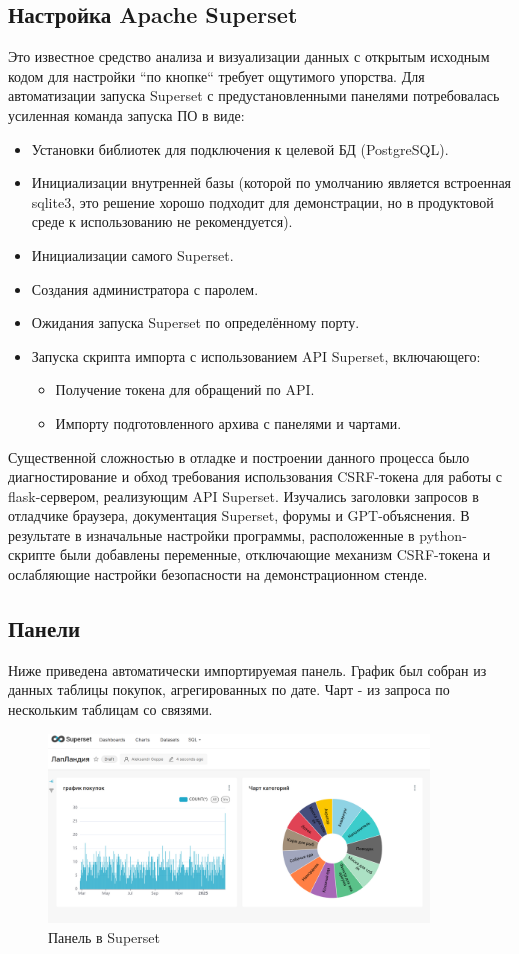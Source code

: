 \subsection{Настройка Apache Superset}\label{subsec:-apache-superset}
Это известное средство анализа и визуализации данных с открытым исходным кодом для настройки ``по кнопке``
требует ощутимого упорства.
Для автоматизации запуска Superset с предустановленными панелями потребовалась усиленная команда запуска ПО в виде:
\begin{itemize}
    \item Установки библиотек для подключения к целевой БД (PostgreSQL).
    \item Инициализации внутренней базы (которой по умолчанию является
    встроенная sqlite3, это решение хорошо подходит для демонстрации, но в продуктовой среде к использованию не
    рекомендуется).
    \item Инициализации самого Superset.
    \item Создания администратора с паролем.
    \item Ожидания запуска Superset по определённому порту.
    \item Запуска скрипта импорта с использованием API Superset, включающего:
    \begin{itemize}
              \item Получение токена для обращений по API\@.
              \item Импорту подготовленного архива с панелями и чартами.
    \end{itemize}
\end{itemize}

Существенной сложностью в отладке и построении данного процесса было диагностирование и обход требования
использования CSRF-токена для работы с flask-сервером, реализующим API Superset.
Изучались заголовки запросов в отладчике браузера, документация Superset, форумы и GPT-объяснения.
В результате в изначальные настройки программы, расположенные в python-скрипте были добавлены переменные,
отключающие механизм CSRF-токена и ослабляющие настройки безопасности на демонстрационном стенде.

\subsection{Панели}\label{subsec:supersetpanels}

Ниже приведена автоматически импортируемая панель.
График был собран из данных таблицы покупок, агрегированных по дате.
Чарт - из запроса по нескольким таблицам со связями.

\begin{figure}[htbp]
    \centering
    \includegraphics[width=0.9\textwidth]{superset} %
    \caption{Панель в Superset}\label{fig:supersetpic}
\end{figure}